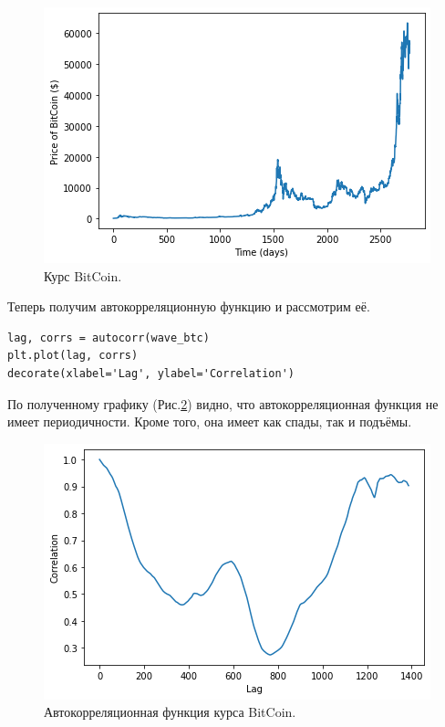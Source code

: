 \documentclass[a4paper, 14pt]{extarticle}
\begin{document}
    \begin{figure}[h]
        \centering
        \includegraphics[width=0.8\linewidth]{resources/Images/task3_wave_btc}
        \caption{Курс BitCoin.}
        \label{fig:task3_wave_btc}
    \end{figure}

    Теперь получим автокорреляционную функцию и рассмотрим её.

    \begin{lstlisting}[caption= Получение автокорреляционной функции для курса BitCon., label={lst:task3_autocorr_btc}]
lag, corrs = autocorr(wave_btc)
plt.plot(lag, corrs)
decorate(xlabel='Lag', ylabel='Correlation')    \end{lstlisting}

    По полученному графику (Рис.\ref{fig:task3_autocorr_btc}) видно, что автокорреляционная функция не имеет периодичности.
    Кроме того, она имеет как спады, так и подъёмы.

    \begin{figure}[H]
        \centering
        \includegraphics[width=0.8\linewidth]{resources/Images/task3_autocorr_btc}
        \caption{Автокорреляционная функция курса BitCoin.}
        \label{fig:task3_autocorr_btc}
    \end{figure}
\end{document}
